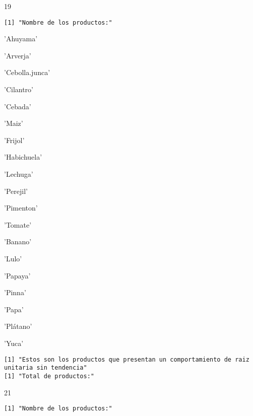 \documentclass[11pt]{article}
\begin{document}
    19

    
    \begin{Verbatim}[commandchars=\\\{\}]
[1] "Nombre de los productos:"

    \end{Verbatim}

    \begin{enumerate*}
\item 'Ahuyama'
\item 'Arverja'
\item 'Cebolla.junca'
\item 'Cilantro'
\item 'Cebada'
\item 'Maiz'
\item 'Frijol'
\item 'Habichuela'
\item 'Lechuga'
\item 'Perejil'
\item 'Pimenton'
\item 'Tomate'
\item 'Banano'
\item 'Lulo'
\item 'Papaya'
\item 'Pinna'
\item 'Papa'
\item 'Plátano'
\item 'Yuca'
\end{enumerate*}


    
    \begin{Verbatim}[commandchars=\\\{\}]
[1] "Estos son los productos que presentan un comportamiento de raiz unitaria sin tendencia"
[1] "Total de productos:"

    \end{Verbatim}

    21

    
    \begin{Verbatim}[commandchars=\\\{\}]
[1] "Nombre de los productos:"

    \end{Verbatim}
\end{document}

